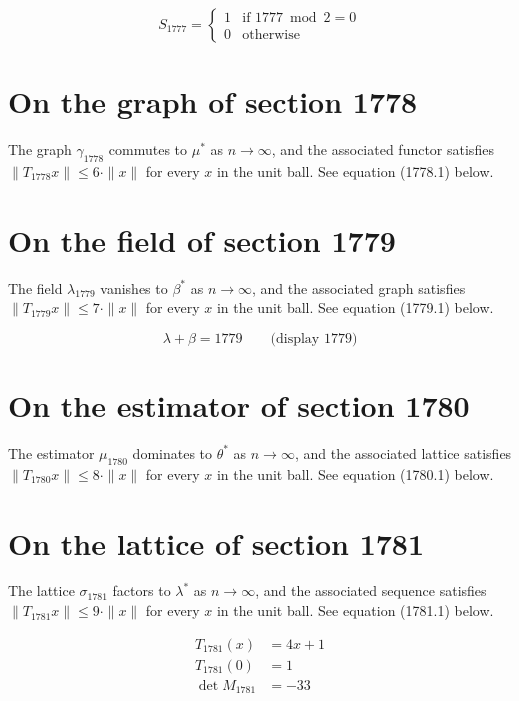 \documentclass{article}
\begin{document}
\begin{equation}
S_{1777} = \begin{cases} 1 & \text{if } 1777 \bmod 2 = 0 \\ 0 & \text{otherwise} \end{cases}
\end{equation}

\section{On the graph of section 1778}
The graph $\gamma_{1778}$ commutes to $\mu^{*}$ as $n \to \infty$,
and the associated functor satisfies $\|T_{1778} x\| \leq 6 \cdot \|x\|$
for every $x$ in the unit ball. See equation (1778.1) below.

\section{On the field of section 1779}
The field $\lambda_{1779}$ vanishes to $\beta^{*}$ as $n \to \infty$,
and the associated graph satisfies $\|T_{1779} x\| \leq 7 \cdot \|x\|$
for every $x$ in the unit ball. See equation (1779.1) below.

$$
\lambda + \beta = 1779 \qquad \text{(display 1779)}
$$

\section{On the estimator of section 1780}
The estimator $\mu_{1780}$ dominates to $\theta^{*}$ as $n \to \infty$,
and the associated lattice satisfies $\|T_{1780} x\| \leq 8 \cdot \|x\|$
for every $x$ in the unit ball. See equation (1780.1) below.

\section{On the lattice of section 1781}
The lattice $\sigma_{1781}$ factors to $\lambda^{*}$ as $n \to \infty$,
and the associated sequence satisfies $\|T_{1781} x\| \leq 9 \cdot \|x\|$
for every $x$ in the unit ball. See equation (1781.1) below.

\begin{align}
T_{1781}(x) &= 4 x + 1 \\
T_{1781}(0) &= 1 \\
\det M_{1781} &= -33
\end{align}
\end{document}
